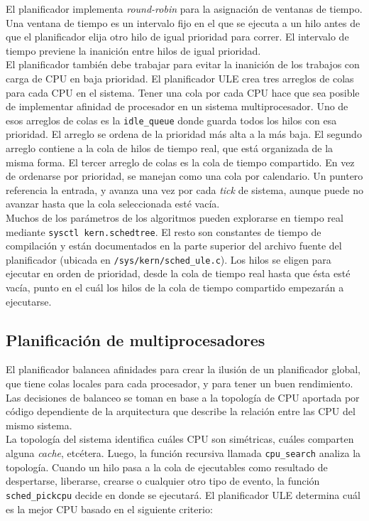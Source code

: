 \documentclass[a4paper]{book}
\begin{document}
El planificador implementa \emph{round-robin} para la asignación de ventanas de tiempo. Una ventana de tiempo es un intervalo fijo en el que se ejecuta a un hilo antes de que el planificador elija otro hilo de igual prioridad para correr. El intervalo de tiempo previene la inanición entre hilos de igual prioridad.\\

El planificador también debe trabajar para evitar la inanición de los trabajos con carga de CPU en baja prioridad. El planificador ULE crea tres arreglos de colas para cada CPU en el sistema. Tener una cola por cada CPU hace que sea posible de implementar afinidad de procesador en un sistema multiprocesador. Uno de esos arreglos de colas es la \verb|idle_queue| donde guarda todos los hilos con esa prioridad. El arreglo se ordena de la prioridad más alta a la más baja. El segundo arreglo contiene a la cola de hilos de tiempo real, que está organizada de la misma forma. El tercer arreglo de colas es la cola de tiempo compartido. En vez de ordenarse por prioridad, se manejan como una cola por calendario. Un puntero referencia la entrada, y avanza una vez por cada \emph{tick} de sistema, aunque puede no avanzar hasta que la cola seleccionada esté vacía.\\

Muchos de los parámetros de los algoritmos pueden explorarse en tiempo real mediante \verb|sysctl kern.schedtree|. El resto son constantes de tiempo de compilación y están documentados en la parte superior del archivo fuente del planificador (ubicada en \verb|/sys/kern/sched_ule.c|).
Los hilos se eligen para ejecutar en orden de prioridad, desde la cola de tiempo real hasta que ésta esté vacía, punto en el cuál los hilos de la cola de tiempo compartido empezarán a ejecutarse.

\subsection{Planificaci\'on de multiprocesadores}

El planificador balancea afinidades para crear la ilusión de un planificador global, que tiene colas locales para cada procesador, y para tener un buen rendimiento. Las decisiones de balanceo se toman en base a la topología de CPU aportada por código dependiente de la arquitectura que describe la relación entre las CPU del mismo sistema.\\

La topología del sistema identifica cuáles CPU son simétricas, cuáles comparten alguna \emph{cache}, etcétera. Luego, la función recursiva llamada \verb|cpu_search| analiza la topolog\'ia. Cuando un hilo pasa a la cola de ejecutables como resultado de despertarse, liberarse, crearse o cualquier otro tipo de evento, la función \verb|sched_pickcpu| decide en donde se ejecutar\'a. El planificador ULE determina cuál es la mejor CPU basado en el siguiente criterio:
\end{document}
